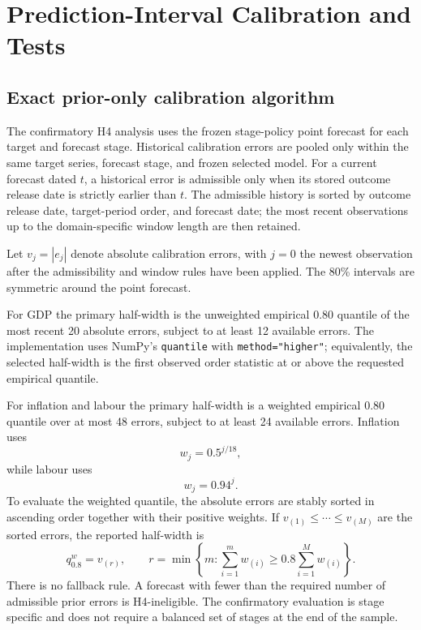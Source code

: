 \section{Prediction-Interval Calibration and Tests}
\label{app:intervals}
\setcounter{table}{0}

\subsection{Exact prior-only calibration algorithm}

The confirmatory H4 analysis uses the frozen stage-policy point forecast for
each target and forecast stage.  Historical calibration errors are pooled
only within the same target series, forecast stage, and frozen selected
model.  For a current forecast dated \(t\), a historical error is admissible
only when its stored outcome release date is strictly earlier than \(t\).
The admissible history is sorted by outcome release date, target-period
order, and forecast date; the most recent observations up to the
domain-specific window length are then retained.

Let \(v_j=|e_j|\) denote absolute calibration errors, with \(j=0\) the newest
observation after the admissibility and window rules have been applied.
The 80\% intervals are symmetric around the point forecast.

For GDP the primary half-width is the unweighted empirical 0.80 quantile of
the most recent 20 absolute errors, subject to at least 12 available errors.
The implementation uses NumPy's \texttt{quantile} with
\texttt{method="higher"}; equivalently, the selected half-width is the first
observed order statistic at or above the requested empirical quantile.

For inflation and labour the primary half-width is a weighted empirical
0.80 quantile over at most 48 errors, subject to at least 24 available
errors.  Inflation uses
\[
    w_j = 0.5^{j/18},
\]
while labour uses
\[
    w_j = 0.94^j.
\]
To evaluate the weighted quantile, the absolute errors are stably sorted in
ascending order together with their positive weights.  If
\(v_{(1)}\leq\cdots\leq v_{(M)}\) are the sorted errors, the reported
half-width is
\[
    q_{0.8}^{w}
    =
    v_{(r)},\qquad
    r=\min\left\{
        m:\sum_{i=1}^{m}w_{(i)}
        \geq 0.8\sum_{i=1}^{M}w_{(i)}
    \right\}.
\]
There is no fallback rule.  A forecast with fewer than the required number
of admissible prior errors is H4-ineligible.  The confirmatory evaluation is
stage specific and does not require a balanced set of stages at the end of
the sample.

